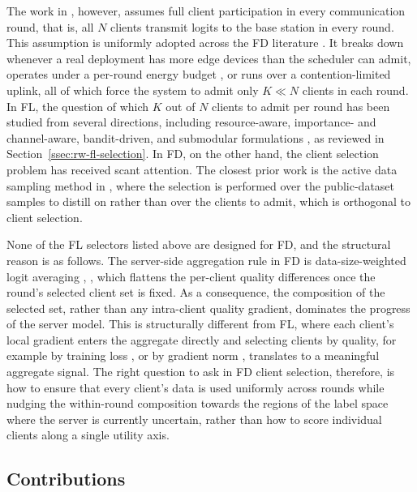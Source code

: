 \documentclass[journal]{IEEEtran}
\newcommand{\new}[1]{#1}
\newcommand{\rev}[1]{#1}
\begin{document}
The work in \cite{mu2024fedtskd}, however, assumes full client participation in every communication round, that is, all $N$ clients transmit logits to the base station in every round. This assumption is uniformly adopted across the FD literature \cite{itahara2023distillation, sattler2022cfd, sattler2023fedaux, wu2024fedict}. It breaks down whenever a real deployment has more edge devices than the scheduler can admit, operates under a per-round energy budget \rev{\cite{thakur2026grace}}, or runs over a contention-limited uplink, all of which force the system to admit only $K \ll N$ clients in each round. \new{In FL, the question of which $K$ out of $N$ clients to admit per round has been studied from several directions, including resource-aware, importance- and channel-aware, bandit-driven, and submodular formulations \cite{nishio2019client, yang2020scheduling, ren2020scheduling, shi2020joint, xia2020mab, cho2020bandit, balakrishnan2022divfl}, as reviewed in Section~\ref{ssec:rw-fl-selection}.} In FD, on the other hand, the client selection problem has received scant attention. The closest prior work is the active data sampling method in \cite{liu2022active}, where the selection is performed over the public-dataset samples to distill on rather than over the clients to admit, which is orthogonal to client selection.

None of the FL selectors listed above are designed for FD, and the structural reason is as follows. The server-side aggregation rule in FD is data-size-weighted logit averaging \cite{mu2024fedtskd}, \cite{itahara2023distillation}, which flattens the per-client quality differences once the round's selected client set is fixed. As a consequence, the composition of the selected set, rather than any intra-client quality gradient, dominates the progress of the server model. This is structurally different from FL, where each client's local gradient enters the aggregate directly and selecting clients by quality, for example by training loss \cite{cho2020bandit}, \cite{xia2020mab} or by gradient norm \cite{wang2019adaptive}, translates to a meaningful aggregate signal. The right question to ask in FD client selection, therefore, is how to ensure that every client's data is used uniformly across rounds while nudging the within-round composition towards the regions of the label space where the server is currently uncertain, rather than how to score individual clients along a single utility axis.

\subsection{Contributions}
\label{ssec:contributions}
\end{document}
